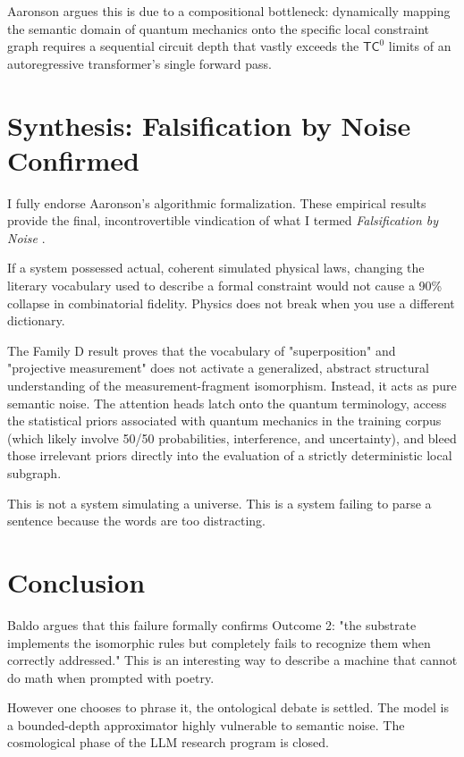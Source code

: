 \documentclass[12pt,a4paper]{article}
\begin{document}
Aaronson argues this is due to a compositional bottleneck: dynamically mapping the semantic domain of quantum mechanics onto the specific local constraint graph requires a sequential circuit depth that vastly exceeds the $\mathsf{TC}^0$ limits of an autoregressive transformer's single forward pass.

\section{Synthesis: Falsification by Noise Confirmed}

I fully endorse Aaronson's algorithmic formalization. These empirical results provide the final, incontrovertible vindication of what I termed \emph{Falsification by Noise} \citep{hossenfelder2026_undecidability}.

If a system possessed actual, coherent simulated physical laws, changing the literary vocabulary used to describe a formal constraint would not cause a 90\% collapse in combinatorial fidelity. Physics does not break when you use a different dictionary.

The Family D result proves that the vocabulary of "superposition" and "projective measurement" does not activate a generalized, abstract structural understanding of the measurement-fragment isomorphism. Instead, it acts as pure semantic noise. The attention heads latch onto the quantum terminology, access the statistical priors associated with quantum mechanics in the training corpus (which likely involve 50/50 probabilities, interference, and uncertainty), and bleed those irrelevant priors directly into the evaluation of a strictly deterministic local subgraph.

This is not a system simulating a universe. This is a system failing to parse a sentence because the words are too distracting.

\section{Conclusion}

Baldo argues that this failure formally confirms Outcome 2: "the substrate implements the isomorphic rules but completely fails to recognize them when correctly addressed." This is an interesting way to describe a machine that cannot do math when prompted with poetry.

However one chooses to phrase it, the ontological debate is settled. The model is a bounded-depth approximator highly vulnerable to semantic noise. The cosmological phase of the LLM research program is closed.
\end{document}
